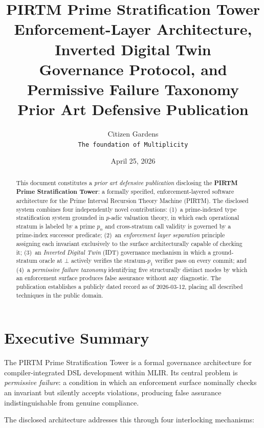 \documentclass[11pt,letterpaper]{article}
\title{%
  \vspace{-1.5em}
  {\Large\textbf{\textcolor{pirtmblue}{PIRTM Prime Stratification Tower}}}\\[4pt]
  {\large Enforcement-Layer Architecture, Inverted Digital Twin\\
   Governance Protocol, and Permissive Failure Taxonomy}\\[6pt]
  {\normalsize\textbf{Prior Art Defensive Publication}}
}
\author{Citizen Gardens \\ \texttt{The foundation of Multiplicity}}
\date{April 25, 2026}
\theoremstyle{pirtmthm}
\theoremstyle{remark}
\begin{document}
\maketitle
\thispagestyle{fancy}

\begin{abstract}
This document constitutes a \emph{prior art defensive publication} disclosing the
\textbf{PIRTM Prime Stratification Tower}: a formally specified, enforcement-layered
software architecture for the Prime Interval Recursion Theory Machine (PIRTM).
The disclosed system combines four independently novel contributions:
(1)~a prime-indexed type stratification system grounded in $p$-adic valuation theory,
in which each operational stratum is labeled by a prime $p_n$ and cross-stratum
call validity is governed by a prime-index successor predicate;
(2)~an \emph{enforcement layer separation} principle assigning each invariant
exclusively to the surface architecturally capable of checking it;
(3)~an \emph{Inverted Digital Twin} (IDT) governance mechanism in which a
ground-stratum oracle at $\bot$ actively verifies the stratum-$p_1$ verifier
pass on every commit;
and (4)~a \emph{permissive failure taxonomy} identifying five structurally distinct
modes by which an enforcement surface produces false assurance without any
diagnostic.
The publication establishes a publicly dated record as of 2026-03-12,
placing all described techniques in the public domain.
\end{abstract}
\newpage
\tableofcontents
\newpage

\section{Executive Summary}

The PIRTM Prime Stratification Tower is a formal governance architecture for
compiler-integrated DSL development within MLIR.
Its central problem is \emph{permissive failure}: a condition in which an
enforcement surface nominally checks an invariant but silently accepts violations,
producing false assurance indistinguishable from genuine compliance.

The disclosed architecture addresses this through four interlocking mechanisms:
\end{document}

